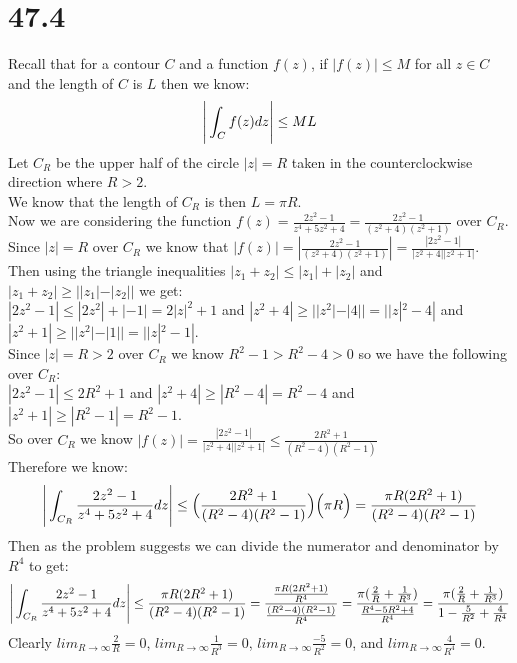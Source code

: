 \documentclass{article}
\begin{document}
\section*{47.4}
\begin{center}
    \doublespacing
     Recall that for a contour $C$ and a function $f(z)$, if $|f(z)|\leq M$ for all $z\in C$ and the length of $C$ is $L$ then we know:
    \[\Bigg{|}\int _C f(z) dz\Bigg{|}\leq ML\]
    Let $C_R$ be the upper half of the circle $|z| = R$ taken in the counterclockwise direction where $R > 2$.
    \\We know that the length of $C_R$ is then $L =\pi R$.
    \\Now we are considering the function $f(z) =\frac{2z^2 - 1}{z^4 + 5z^2 + 4} =\frac{2z^2 - 1}{(z^2 + 4)(z^2 + 1)}$ over $C_R$.
    \\Since $|z| = R$ over $C_R$ we know that $|f(z)| = |\frac{2z^2 - 1}{(z^2 + 4)(z^2 + 1)}| =\frac{|2z^2 - 1|}{|z^2 + 4||z^2 + 1|}$.
    \break
    \\Then using the triangle inequalities $|z_1 + z_2|\leq |z_1| + |z_2|$ and $|z_1 + z_2|\geq ||z_1| - |z_2||$ we get:
    \\$|2z^2 - 1|\leq |2z^2| + |-1| = 2|z|^2 + 1$ and $|z^2 + 4|\geq ||z^2| - |4|| = ||z|^2 - 4|$ and $|z^2 + 1|\geq ||z^2| - |1|| = ||z|^2 - 1|$.
    \\Since $|z| = R > 2$ over $C_R$ we know $R^2 - 1 > R^2 - 4 > 0$ so we have the following over $C_R$:
    \\$|2z^2 - 1|\leq 2R^2 + 1$ and $|z^2 + 4|\geq |R^2 - 4| = R^2 - 4$ and $|z^2 + 1|\geq |R^2 - 1| = R^2 - 1$.
    \break
    \\So over $C_R$ we know $|f(z)| =\frac{|2z^2 - 1|}{|z^2 + 4||z^2 + 1|}\leq\frac{2R^2 + 1}{(R^2 - 4)(R^2 - 1)}$
    \\Therefore we know:
    \[\Bigg{|}\int _{C_R}\frac{2z^2 - 1}{z^4 + 5z^2 + 4} dz\Bigg{|}\leq\Big{(}\frac{2R^2 + 1}{(R^2 - 4)(R^2 - 1)}\Big{)}\Big{(}\pi R\Big{)} =\frac{\pi R(2R^2 + 1)}{(R^2 - 4)(R^2 - 1)}\]
    Then as the problem suggests we can divide the numerator and denominator by $R^4$ to get:
    \[\Bigg{|}\int _{C_R}\frac{2z^2 - 1}{z^4 + 5z^2 + 4} dz\Bigg{|}\leq\frac{\pi R(2R^2 + 1)}{(R^2 - 4)(R^2 - 1)} =\frac{\frac{\pi R(2R^2 + 1)}{R^4}}{\frac{(R^2 - 4)(R^2 - 1)}{R^4}} =\frac{\pi (\frac{2}{R} +\frac{1}{R^3})}{\frac{R^4 - 5R^2 + 4}{R^4}} =\frac{\pi (\frac{2}{R} +\frac{1}{R^3})}{1 -\frac{5}{R^2} +\frac{4}{R^4}}\]
    Clearly $lim _{R\rightarrow\infty}\frac{2}{R} = 0$, $lim _{R\rightarrow\infty}\frac{1}{R^3} = 0$, $lim _{R\rightarrow\infty}\frac{-5}{R^2} = 0$, and $lim _{R\rightarrow\infty}\frac{4}{R^4} = 0$.

\end{center}
\end{document}

